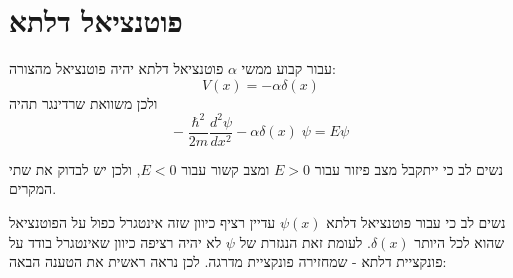 \documentclass{tstextbook}
\begin{document}
\section{פוטנציאל דלתא}

\begin{definition}
עבור קבוע ממשי \(\alpha\) פוטנציאל דלתא יהיה פוטנציאל מהצורה:
$$V(x)=-\alpha \delta(x)$$
ולכן משוואת שרדינגר תהיה
$$-\;\frac{\hbar^{2}}{2m}\frac{d^{2}\psi}{d x^{2}}-\alpha\delta(x)\;\psi=E\psi$$

\end{definition}
נשים לב כי ייתקבל מצב פיזור עבור \(E>0\) ומצב קשור עבור \(E<0\), ולכן יש לבדוק את שתי המקרים.

נשים לב כי עבור פוטנציאל דלתא \(\psi(x)\) עדיין רציף כיוון שזה אינטגרל כפול על הפוטנציאל שהוא לכל היותר \(\delta(x)\). לעומת זאת הנגזרת של \(\psi\) לא יהיה רציפה כיוון שאינטגרל בודד על פונקציית דלתא - שמחזירה פונקציית מדרגה. לכן נראה ראשית את הטענה הבאה:
\end{document}
